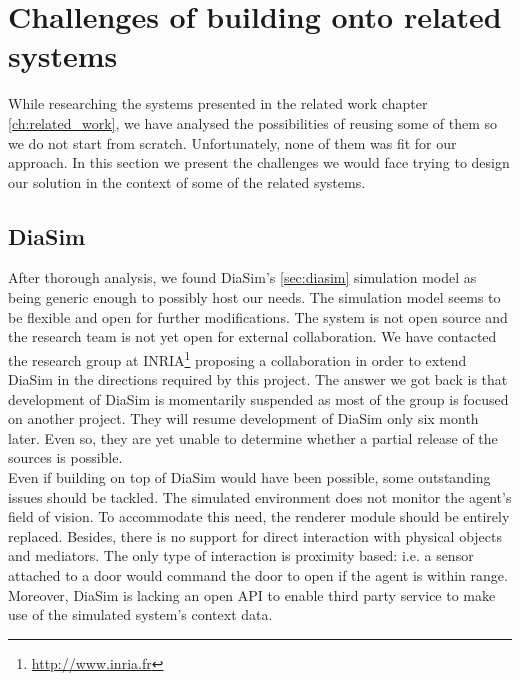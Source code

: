 \section{Challenges of building onto related systems} %
\label{sec:reusing_related_systems}
While researching the systems presented in the related work chapter \ref{ch:related_work}, we have analysed the possibilities of reusing some of them so we do not start from scratch. Unfortunately, none of them was fit for our approach. In this section we present the challenges we would face trying to design our solution in the context of some of the related systems.

\subsection{DiaSim}\label{subsec:design_diasim}
After thorough analysis, we found DiaSim's \ref{sec:diasim} simulation model as being generic enough to possibly host our needs. The simulation model seems to be flexible and open for further modifications. The system is not open source and the research team is not yet open for external collaboration. We have contacted the research group at INRIA\footnote{\url{http://www.inria.fr}} proposing a collaboration in order to extend DiaSim in the directions required by this project. The answer we got back is that development of DiaSim is momentarily suspended as most of the group is focused on another project. They will resume development of DiaSim only six month later. Even so, they are yet unable to determine whether a partial release of the sources is possible.\\

Even if building on top of DiaSim would have been possible, some outstanding issues should be tackled. The simulated environment does not monitor the agent's field of vision. To accommodate this need, the renderer module should be entirely replaced. Besides, there is no support for direct interaction with physical objects and mediators. The only type of interaction is proximity based: i.e. a sensor attached to a door would command the door to open if the agent is within range. Moreover, DiaSim is lacking an open API to enable third party service to make use of the simulated system's context data.\\

